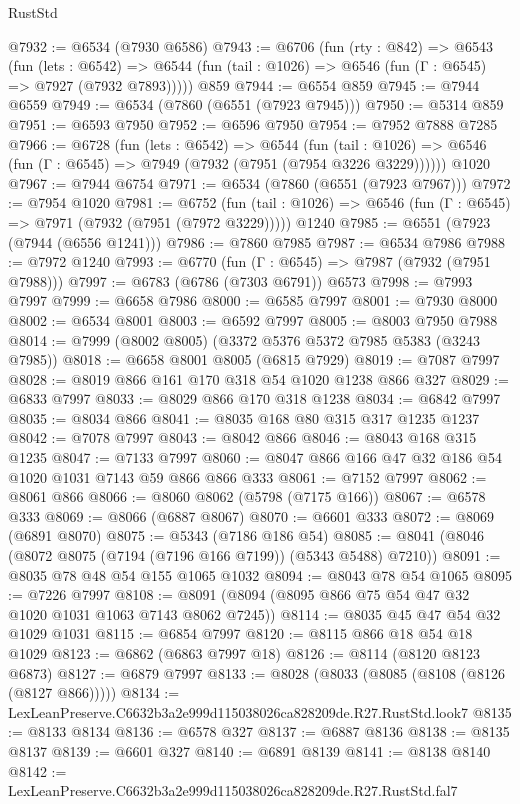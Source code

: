 \begin{lexlean}{RustStd}
\begin{coremodule}
@7932 := @6534 (@7930 @6586)
@7943 := @6706
    (fun (rty : @842) =>
    @6543
      (fun (lets : @6542) =>
      @6544 (fun (tail : @1026) => @6546 (fun (Γ : @6545) => @7927 (@7932 @7893)))))
    @859
@7944 := @6554 @859
@7945 := @7944 @6559
@7949 := @6534 (@7860 (@6551 (@7923 @7945)))
@7950 := @5314 @859
@7951 := @6593 @7950
@7952 := @6596 @7950
@7954 := @7952 @7888 @7285
@7966 := @6728
    (fun (lets : @6542) =>
    @6544
      (fun (tail : @1026) => @6546 (fun (Γ : @6545) => @7949 (@7932 (@7951 (@7954 @3226 @3229))))))
    @1020
@7967 := @7944 @6754
@7971 := @6534 (@7860 (@6551 (@7923 @7967)))
@7972 := @7954 @1020
@7981 := @6752
    (fun (tail : @1026) => @6546 (fun (Γ : @6545) => @7971 (@7932 (@7951 (@7972 @3229)))))
    @1240
@7985 := @6551 (@7923 (@7944 (@6556 @1241)))
@7986 := @7860 @7985
@7987 := @6534 @7986
@7988 := @7972 @1240
@7993 := @6770 (fun (Γ : @6545) => @7987 (@7932 (@7951 @7988)))
@7997 := @6783 (@6786 (@7303 @6791)) @6573
@7998 := @7993 @7997
@7999 := @6658 @7986
@8000 := @6585 @7997
@8001 := @7930 @8000
@8002 := @6534 @8001
@8003 := @6592 @7997
@8005 := @8003 @7950 @7988
@8014 := @7999 (@8002 @8005) (@3372 @5376 @5372 @7985 @5383 (@3243 @7985))
@8018 := @6658 @8001 @8005 (@6815 @7929)
@8019 := @7087 @7997
@8028 := @8019 @866 @161 @170 @318 @54 @1020 @1238 @866 @327
@8029 := @6833 @7997
@8033 := @8029 @866 @170 @318 @1238
@8034 := @6842 @7997
@8035 := @8034 @866
@8041 := @8035 @168 @80 @315 @317 @1235 @1237
@8042 := @7078 @7997
@8043 := @8042 @866
@8046 := @8043 @168 @315 @1235
@8047 := @7133 @7997
@8060 := @8047 @866 @166 @47 @32 @186 @54 @1020 @1031 @7143 @59 @866 @866 @333
@8061 := @7152 @7997
@8062 := @8061 @866
@8066 := @8060 @8062 (@5798 (@7175 @166))
@8067 := @6578 @333
@8069 := @8066 (@6887 @8067)
@8070 := @6601 @333
@8072 := @8069 (@6891 @8070)
@8075 := @5343 (@7186 @186 @54)
@8085 := @8041 (@8046 (@8072 @8075 (@7194 (@7196 @166 @7199)) (@5343 @5488) @7210))
@8091 := @8035 @78 @48 @54 @155 @1065 @1032
@8094 := @8043 @78 @54 @1065
@8095 := @7226 @7997
@8108 := @8091 (@8094 (@8095 @866 @75 @54 @47 @32 @1020 @1031 @1063 @7143 @8062 @7245))
@8114 := @8035 @45 @47 @54 @32 @1029 @1031
@8115 := @6854 @7997
@8120 := @8115 @866 @18 @54 @18 @1029
@8123 := @6862 (@6863 @7997 @18)
@8126 := @8114 (@8120 @8123 @6873)
@8127 := @6879 @7997
@8133 := @8028 (@8033 (@8085 (@8108 (@8126 (@8127 @866)))))
@8134 := LexLeanPreserve.C6632b3a2e999d115038026ca828209de.R27.RustStd.look7
@8135 := @8133 @8134
@8136 := @6578 @327
@8137 := @6887 @8136
@8138 := @8135 @8137
@8139 := @6601 @327
@8140 := @6891 @8139
@8141 := @8138 @8140
@8142 := LexLeanPreserve.C6632b3a2e999d115038026ca828209de.R27.RustStd.fal7

\end{coremodule}
\end{lexlean}
